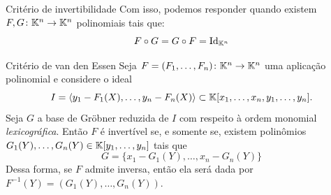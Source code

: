 \begin{frame}{Critério de invertibilidade}
Com isso, podemos responder quando existem $F,G\colon\mathbb{K}^n\to\mathbb{K}^n$ polinomiais tais que: \[F \circ G = G \circ F = \mathrm{Id}_{\mathbb{K}^n}\]
    \begin{teobox}{Critério de van den Essen}
        Seja $F=(F_1,\ldots,F_n)\colon \mathbb{K}^n \to \mathbb{K}^n$ uma aplicação polinomial e considere o ideal \[I=\langle y_1-F_1(X),\ldots,y_n-F_n(X)\rangle \subset \mathbb{K}[x_1,\ldots,x_n,y_1,\ldots,y_n].\]
Seja $G$ a base de Gröbner reduzida de $I$ com respeito à ordem monomial \textit{lexicográfica}. Então $F$ é invertível se, e somente se, existem polinômios 
\(G_1(Y),\ldots,G_n(Y) \in \mathbb{K}[y_1,\ldots,y_n]\) tais que \[G=\{x_1-G_1(Y),\ldots,x_n-G_n(Y)\}\]
Dessa forma, se $F$ admite inversa, então ela será dada por $F^{-1}(Y)=(G_1(Y),\ldots,G_n(Y)).$
    \end{teobox}
\end{frame}